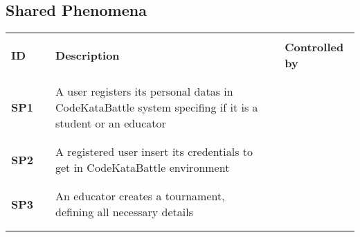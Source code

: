 \subsection{Shared Phenomena}

\renewcommand{\arraystretch}{0.5}
\begin{longtable}[H]{l l p{8.5cm} l l}
    \hline
                   &        &                                                                                                                                 &        &                        \\
    \textbf{ID}    & \vline & \textbf{Description}                                                                                                            & \vline & \textbf{Controlled by} \\
                   &        &                                                                                                                                 &        &                        \\\hline & & & & \\
    \textbf{SP1}   & \vline & A user registers its personal datas in CodeKataBattle system specifing if it is a student or an educator                        & \vline &                        \\
                   &        &                                                                                                                                 &        &                        \\\hline & & & & \\
    \textbf{SP2}   & \vline & A registered user insert its credentials to get in CodeKataBattle environment                                                   & \vline &                        \\
                   &        &                                                                                                                                 &        &                        \\\hline & & & & \\
    \textbf{SP3}   & \vline & An educator creates a tournament, defining all necessary details                                                                & \vline &                        \\
                   &        &                                                                                                                                 &        &                        \\\hline & & & & \\

\end{longtable}
